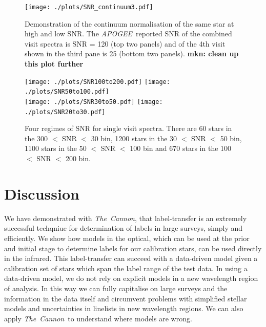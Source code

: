 \documentclass[12pt, preprint]{aastex}
\newcommand{\teff}{\mbox{$\rm T_{eff}$}}
\newcommand{\logg}{\mbox{$\rm \log g$}}
\newcommand{\tc}{\textsl{The~Cannon}}
\newcommand{\apogee}{\textsl{APOGEE}}
\begin{document}
 \begin{figure}[!h]
  \texttt{[image: ./plots/SNR\_continuum3.pdf]}
  \caption{Demonstration of the continuum normalisation of the same star at high and low SNR. The \apogee\ reported SNR of the combined visit spectra is SNR = 120 (top two panels) and of the 4th visit shown in the third pane is 25 (bottom two panels). \textbf{mkn: clean up this plot further} }
\label{fig:lowsnr}
\end{figure}

 \begin{figure}[!h]
 \centering
 \texttt{[image: ./plots/SNR100to200.pdf]}
\texttt{[image: ./plots/SNR50to100.pdf]}\\
\texttt{[image: ./plots/SNR30to50.pdf]}
\texttt{[image: ./plots/SNR20to30.pdf]}
    \caption{Four regimes of SNR for single visit spectra. There are 60 stars in the 300 $<$  SNR $<$ 30 bin, 1200 stars in the 30 $<$ SNR $<$ 50 bin, 1100 stars in the 50 $<$ SNR $<$ 100 bin and 670 stars in the 100 $<$  SNR $<$ 200 bin.}
\label{fig:SNR}
\end{figure}



\section{Discussion}

We have demonstrated with \tc,  that label-transfer is an extremely successful techqniue for determination of labels in large surveys, simply and efficiently. We show how models in the optical, which can be used at the prior and initial stage to determine labels for our calibration stars, can be used directly in the infrared. This label-transfer can succeed with a data-driven model given a calibration set of stars which span the label range of the test data. In using a data-driven model, we do not rely on explicit models in a new wavelength region of analysis. In this way we can fully capitalise on large surveys and the information in the data itself and circumvent problems with simplified stellar models and uncertainties in linelists in new wavelength regions. We can also apply \tc\ to understand where models are wrong.  

\end{document}
